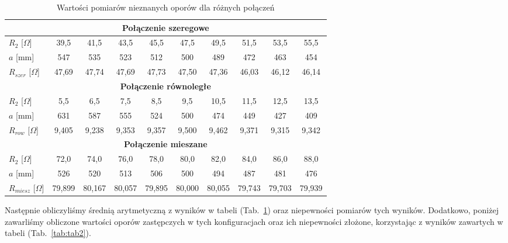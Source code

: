\documentclass[12pt,a4paper]{article}
\numberwithin{equation}{section}
\begin{document}
\begin{table}[!ht]
	\caption{Wartości pomiarów nieznanych oporów dla różnych połączeń}
	\begin{adjustbox}{width=1\textwidth}
		\begin{center}
			\begin{tabular}{l||c|c|c|c|c|c|c|c|c}
				\multicolumn{10}{c}{\bfseries Połączenie szeregowe} \\ \hline
				$R_2$ [$\Omega$] & 39,5 & 41,5 & 43,5 & 45,5 & 47,5 & 49,5 & 51,5 & 53,5 & 55,5 \\
				$a$ [mm] & 547 & 535 & 523 & 512 & 500 & 489 & 472 & 463 & 454 \\
				$R_{szer}$ [$\Omega$] & 47,69 & 47,74 & 47,69 & 47,73 & 47,50 & 47,36 & 46,03 & 46,12 & 46,14 \\ \hline
				\multicolumn{10}{c}{\bfseries Połączenie równoległe} \\ \hline
				$R_2$ [$\Omega$] & 5,5 & 6,5 & 7,5 & 8,5 & 9,5 & 10,5 & 11,5 & 12,5 & 13,5 \\
				$a$ [mm] & 631 & 587 & 555 & 524 & 500 & 474 & 449 & 427 & 409 \\
				$R_{row}$ [$\Omega$] & 9,405 & 9,238 & 9,353 & 9,357 & 9,500 & 9,462 & 9,371 & 9,315 & 9,342 \\ \hline
				\multicolumn{10}{c}{\bfseries Połączenie mieszane} \\ \hline
				$R_2$ [$\Omega$] & 72,0 & 74,0 & 76,0 & 78,0 & 80,0 & 82,0 & 84,0 & 86,0 & 88,0 \\
				$a$ [mm] & 526 & 520 & 513 & 506 & 500 & 494 & 487 & 481 & 476 \\
				$R_{miesz}$ [$\Omega$] & 79,899 & 80,167 & 80,057 & 79,895 & 80,000 & 80,055 & 79,743 & 79,703 & 79,939 \\ \hline
			\end{tabular}
		\end{center}
	\end{adjustbox}
	\label{tab:tab3}
\end{table}

Następnie obliczyliśmy średnią arytmetyczną z wyników w tabeli \mbox{(Tab. \ref{tab:tab3})} oraz niepewności pomiarów tych wyników. Dodatkowo, poniżej zawarliśmy obliczone wartości oporów zastępczych w tych konfiguracjach oraz ich niepewności złożone, korzystając z wyników zawartych w tabeli (\mbox{Tab. \ref{tab:tab2}}).
\end{document}
